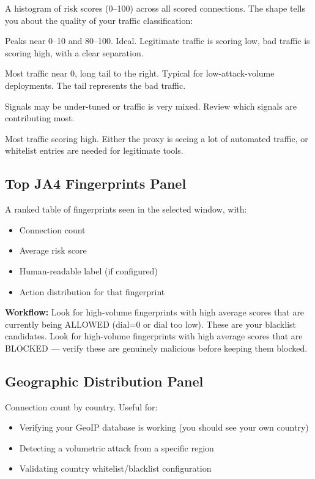 A histogram of risk scores (0--100) across all scored connections. The shape
tells you about the quality of your traffic classification:

\begin{description}[leftmargin=3.5cm]
  \item[Bimodal] Peaks near 0--10 and 80--100. Ideal. Legitimate traffic is
    scoring low, bad traffic is scoring high, with a clear separation.
  \item[Left-skewed] Most traffic near 0, long tail to the right. Typical for
    low-attack-volume deployments. The tail represents the bad traffic.
  \item[Flat/uniform] Signals may be under-tuned or traffic is very mixed.
    Review which signals are contributing most.
  \item[Right-skewed] Most traffic scoring high. Either the proxy is seeing a
    lot of automated traffic, or whitelist entries are needed for legitimate tools.
\end{description}

\subsection{Top JA4 Fingerprints Panel}

A ranked table of fingerprints seen in the selected window, with:
\begin{itemize}
  \item Connection count
  \item Average risk score
  \item Human-readable label (if configured)
  \item Action distribution for that fingerprint
\end{itemize}

\textbf{Workflow:} Look for high-volume fingerprints with high average scores
that are currently being ALLOWED (dial=0 or dial too low). These are your
blacklist candidates. Look for high-volume fingerprints with high average scores
that are BLOCKED — verify these are genuinely malicious before keeping them blocked.

\subsection{Geographic Distribution Panel}

Connection count by country. Useful for:
\begin{itemize}
  \item Verifying your GeoIP database is working (you should see your own country)
  \item Detecting a volumetric attack from a specific region
  \item Validating country whitelist/blacklist configuration
\end{itemize}

